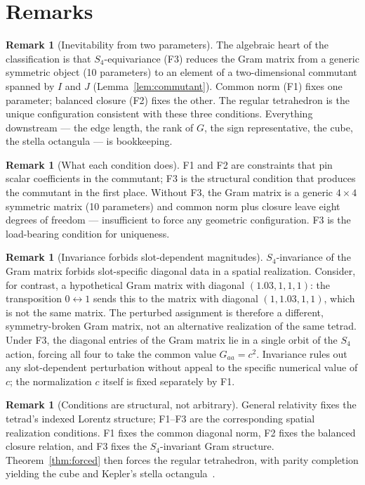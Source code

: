\documentclass[twocolumn]{iopjournal}
\theoremstyle{definition}
\newtheorem{remark}[lemma]{Remark}
\begin{document}
\section*{Remarks}

\begin{remark}[Inevitability from two parameters]
\label{rem:two_params}
The algebraic heart of the classification is that
$S_4$-equivariance (F3) reduces the Gram matrix from a generic
symmetric object (10 parameters) to an element of a two-dimensional
commutant spanned by $I$ and $J$ (Lemma~\ref{lem:commutant}).
Common norm (F1) fixes one parameter; balanced closure (F2) fixes
the other.  The regular tetrahedron is the unique configuration
consistent with these three conditions.  Everything downstream ---
the edge length, the rank of $G$, the sign representative, the
cube, the stella octangula --- is bookkeeping.
\end{remark}

\begin{remark}[What each condition does]
\label{rem:roles}
F1 and F2 are constraints that pin scalar coefficients in the
commutant; F3 is the structural condition that produces the
commutant in the first place.  Without F3, the Gram matrix is a
generic $4 \times 4$ symmetric matrix (10 parameters) and common
norm plus closure leave eight degrees of freedom ---
insufficient to force any geometric configuration.  F3 is the
load-bearing condition for uniqueness.
\end{remark}

\begin{remark}[Invariance forbids slot-dependent magnitudes]
\label{rem:perturbation}
$S_4$-invariance of the Gram matrix forbids slot-specific diagonal
data in a spatial realization.  Consider, for contrast, a
hypothetical Gram matrix with diagonal $(1.03, 1, 1, 1)$: the
transposition $0 \leftrightarrow 1$ sends this to the matrix with
diagonal $(1, 1.03, 1, 1)$, which is not the same matrix.  The
perturbed assignment is therefore a different, symmetry-broken
Gram matrix, not an alternative realization of the same tetrad.
Under F3, the diagonal entries of the Gram matrix lie in a single
orbit of the $S_4$ action, forcing all four to take the common
value $G_{aa} = c^2$.  Invariance rules out any slot-dependent
perturbation without appeal to the specific numerical value of
$c$; the normalization $c$ itself is fixed separately by F1.
\end{remark}

\begin{remark}[Conditions are structural, not arbitrary]
\label{rem:structural}
General relativity fixes the tetrad's indexed Lorentz structure;
F1--F3 are the corresponding spatial realization conditions.  F1
fixes the common diagonal norm, F2 fixes the balanced closure
relation, and F3 fixes the $S_4$-invariant Gram structure.
Theorem~\ref{thm:forced} then forces the regular tetrahedron,
with parity completion yielding the cube and Kepler's stella
octangula~\cite{Kepler1619,Cromwell1997}.
\end{remark}
\end{document}
